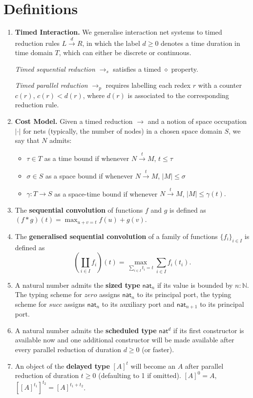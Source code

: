 \documentclass{fit-teorsem}
\begin{document}
\section*{Definitions}
\begin{enumerate}
\item \textbf{Timed Interaction.} We generalise interaction net systems to timed reduction rules
	$L \stackrel{d}{\longrightarrow} R$, in which the label $d \ge 0$ denotes a time duration
	in time domain $T$, which can either be discrete or continuous.

	\textit{Timed sequential reduction} $\longrightarrow_s$ satisfies a timed $\diamond$ property.

	\textit{Timed parallel reduction} $\longrightarrow_p$ requires labelling each redex $r$ with
	a counter $c(r)$, $c(r) < d(r)$, where $d(r)$ is associated to the corresponding reduction rule.

\item \textbf{Cost Model.} Given a timed reduction $\longrightarrow$ and a notion of space
	occupation $|\cdot|$ for nets (typically, the number of nodes) in a chosen
	space domain $S$, we say that $N$ admits:
	\begin{itemize}
		\item $\tau \in T$ as a time bound if whenever
			$N \stackrel{t}{\longrightarrow} M$, $t \le \tau$
		\item $\sigma \in S$ as a space bound if whenever
			$N \stackrel{t}{\longrightarrow} M$, $|M| \le \sigma$
		\item $\gamma : T \to S$ as a space-time bound if whenever
			$N \stackrel{t}{\longrightarrow} M$, $|M| \le \gamma(t).$
	\end{itemize}

\item The \textbf{sequential convolution} of functions $f$ and $g$ is defined as
	$(f \ast g)(t) = \max_{u + v = t} f(u) + g(v)$.

\item The \textbf{generalised sequential convolution} of a family of functions $\{f_i\}_{i \in I}$ is
	defined as \[
		\left(\coprod_{i \in I} f_i\right)(t) = \max_{\sum_{i \in I} t_i = t} \sum_{i \in I} f_i(t_i)
	.\]

\item A natural number admits the \textbf{sized type} $\mathsf{nat}_n$ if its value is bounded by
	$n : \mathbb{N}$. The typing scheme for $zero$ assigns $\mathsf{nat}_n$ to its principal port,
	the typing scheme for $succ$ assigns $\mathsf{nat}_n$ to its auxiliary port and
	$\mathsf{nat}_{n + 1}$ to its principal port.

\item A natural number admits the \textbf{scheduled type} $\mathsf{nat}^d$ if its first constructor is
	available now and one additional constructor will be made available after every parallel
	reduction of duration $d \ge 0$ (or faster).

\item An object of the \textbf{delayed type} $[A]^t$ will become an $A$ after parallel reduction of duration
	$t \ge 0$ (defaulting to 1 if omitted). $[A]^0 = A$, $[[A]^{t_1}]^{t_2} = [A]^{t_1 + t_2}$.
\end{enumerate}
\end{document}

